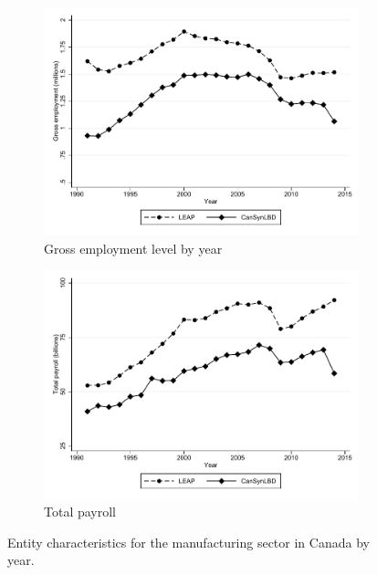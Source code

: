 \documentclass[10pt,twoside]{article}
\begin{document}
\begin{figure}[H]
\centering
\begin{subfigure}[h]{0.48\linewidth}
\label{tab:Can:GrossEmploymentPrivate}
\includegraphics[width=\linewidth]{graphs/Gross_employment_level_by_year_manufacturing_bw.pdf} 
\caption{Gross employment level by year} \end{subfigure}
\hfill
\begin{subfigure}[h]{0.48\linewidth}
\includegraphics[width=\linewidth]{graphs/Total_payroll_by_year_manufacturing_bw.pdf}
\caption{Total payroll}
\end{subfigure}\caption{Entity characteristics for the manufacturing sector in Canada by year.}\label{fig:entity_chracteristics_manufac}
\end{figure}
\end{document}
